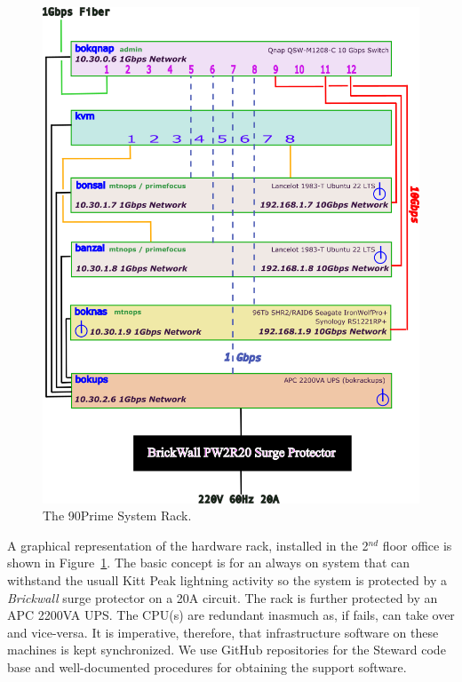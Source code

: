 \documentclass[12pt,twoside]{article}
\begin{document}
\begin{figure}
 \centering
 \includegraphics[angle=0,scale=0.75]{bokrack.png}
 \caption{The 90Prime System Rack.}
 \label{bokrack}
\end{figure}

\noindent A graphical representation of the hardware rack, installed in the 2$^{nd}$ floor office is shown in Figure~\ref{bokrack}.
The basic concept is for an {\sc always on} system that can withstand the usuall Kitt Peak lightning activity so the
system is protected by a \emph{Brickwall} surge protector on a 20A circuit. The rack is further protected by an APC 
2200VA UPS. The CPU(s) are redundant inasmuch as, if  fails,  can take over and vice-versa.
It is imperative, therefore, that infrastructure software on these machines is kept synchronized. We use GitHub repositories
for the Steward code base and well-documented procedures for obtaining the support software.
\end{document}
